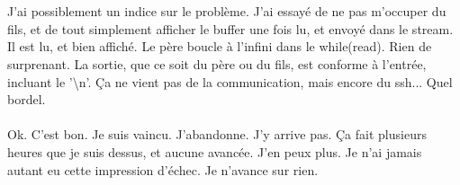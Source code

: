 \\\\
J'ai possiblement un indice sur le problème. J'ai essayé de ne pas m'occuper du fils, et de tout simplement afficher le buffer une fois lu, et envoyé dans le stream. Il est lu, et bien affiché. Le père boucle à l'infini dans le while(read). Rien de surprenant. La sortie, que ce soit du père ou du fils, est conforme à l'entrée, incluant le '\textbackslash{n}'. Ça ne vient pas de la communication, mais encore du ssh... Quel bordel.
\\\\
Ok. C'est bon. Je suis vaincu. J'abandonne. J'y arrive pas. Ça fait plusieurs heures que je suis dessus, et aucune avancée. J'en peux plus. Je n'ai jamais autant eu cette impression d'échec. Je n'avance sur rien.